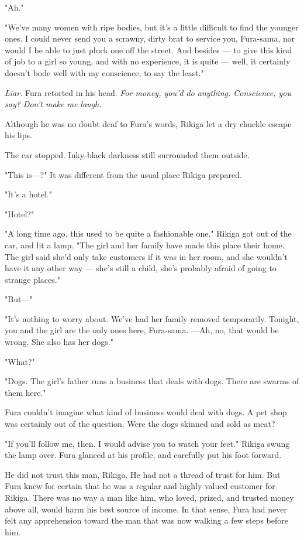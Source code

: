 "Ah."

"We've many women with ripe bodies, but it's a little difficult to find
the younger ones. I could never send you a scrawny, dirty brat to
service you, Fura-sama, nor would I be able to just pluck one off the
street. And besides --- to give this kind of job to a girl so young, and
with no experience, it is quite --- well, it certainly doesn't bode well
with my conscience, to say the least."

\emph{Liar.} Fura retorted in his head. \emph{For money, you'd do anything.
Conscience, you say? Don't make me laugh.}

Although he was no doubt deaf to Fura's words, Rikiga let a dry chuckle
escape his lips.

The car stopped. Inky-black darkness still surrounded them outside.

"This is---?" It was different from the usual place Rikiga prepared.

"It's a hotel."

"Hotel?"

"A long time ago, this used to be quite a fashionable one." Rikiga got
out of the car, and lit a lamp. "The girl and her family have made this
place their home. The girl said she'd only take customers if it was in
her room, and she wouldn't have it any other way --- she's still a child,
she's probably afraid of going to strange places."

"But---"

"It's nothing to worry about. We've had her family removed temporarily.
Tonight, you and the girl are the only ones here, Fura-sama. ---Ah, no,
that would be wrong. She also has her dogs."

"What?"

"Dogs. The girl's father runs a business that deals with dogs. There are
swarms of them here."

Fura couldn't imagine what kind of business would deal with dogs. A pet
shop was certainly out of the question. Were the dogs skinned and sold
as meat?

"If you'll follow me, then. I would advise you to watch your feet."
Rikiga swung the lamp over. Fura glanced at his profile, and carefully
put his foot forward.

He did not trust this man, Rikiga. He had not a thread of trust for him.
But Fura knew for certain that he was a regular and highly valued
customer for Rikiga. There was no way a man like him, who loved, prized,
and trusted money above all, would harm his best source of income. In
that sense, Fura had never felt any apprehension toward the man that was
now walking a few steps before him.

